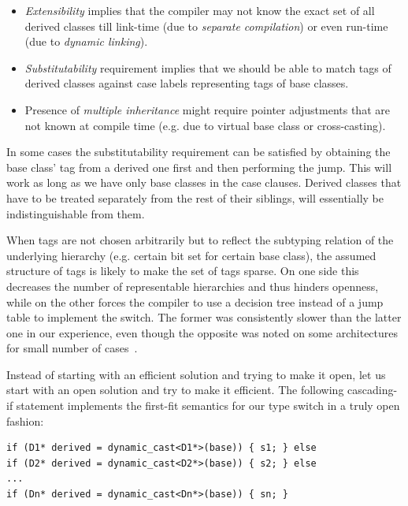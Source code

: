 \begin{itemize}
\setlength{\itemsep}{0pt}
\setlength{\parskip}{0pt}
\item \emph{Extensibility} implies that the compiler may not know the exact set 
      of all derived classes till link-time (due to \emph{separate compilation}) 
      or even run-time (due to \emph{dynamic linking}).
\item \emph{Substitutability} requirement implies that we should be able to 
      match tags of derived classes against case labels representing tags of 
      base classes.
\item Presence of \emph{multiple inheritance} might require pointer adjustments 
      that are not known at compile time (e.g. due to virtual base class or 
      cross-casting).
\end{itemize}

\noindent
In some cases the substitutability requirement can be satisfied by obtaining 
the base class' tag from a derived one first and then performing the jump. 
This will work as long as we have only base classes in the case clauses.
Derived classes that have to be treated separately from the rest of their 
siblings, will essentially be indistinguishable from them.

When tags are not chosen arbitrarily but to reflect the subtyping relation of the 
underlying hierarchy (e.g. certain bit set for certain base class), the assumed 
structure of tags is likely to make the set of tags sparse. On one side this 
decreases the number of representable hierarchies and thus hinders openness, 
while on the other forces the compiler to use a decision tree instead of a jump 
table to implement the switch. The former was consistently slower than the 
latter one in our experience, even though the opposite was noted on some 
architectures for small number of cases~\cite[]{garrigue-98}.

Instead of starting with an efficient solution and trying to make it open, let us 
start with an open solution and try to make it efficient. The following 
cascading-if statement implements the first-fit semantics for our type switch in 
a truly open fashion:

\begin{lstlisting}
if (D1* derived = dynamic_cast<D1*>(base)) { s1; } else
if (D2* derived = dynamic_cast<D2*>(base)) { s2; } else
...
if (Dn* derived = dynamic_cast<Dn*>(base)) { sn; }
\end{lstlisting}

